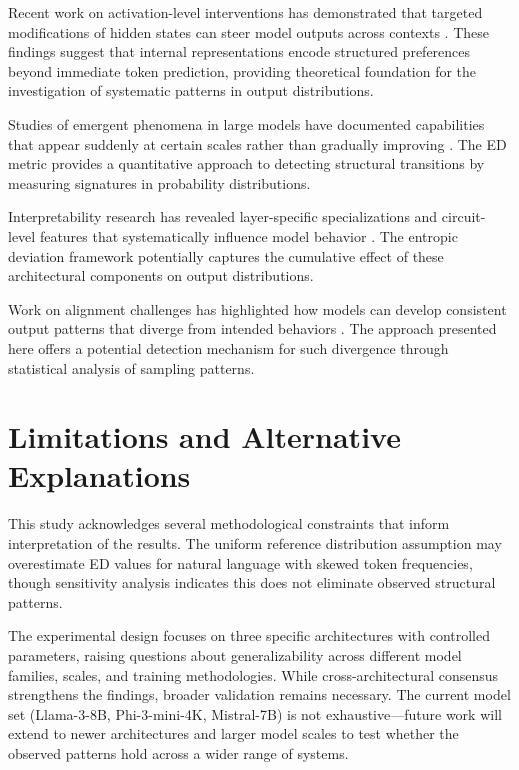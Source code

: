 \documentclass[12pt]{article}
\begin{document}
Recent work on activation-level interventions has demonstrated that targeted modifications of hidden states can steer model outputs across contexts \citep{meng2022locating, zou2023representation}. These findings suggest that internal representations encode structured preferences beyond immediate token prediction, providing theoretical foundation for the investigation of systematic patterns in output distributions.

Studies of emergent phenomena in large models have documented capabilities that appear suddenly at certain scales rather than gradually improving \citep{wei2022emergent}. The ED metric provides a quantitative approach to detecting structural transitions by measuring signatures in probability distributions.

Interpretability research has revealed layer-specific specializations and circuit-level features that systematically influence model behavior \citep{elhage2021mathematical, olsson2022context}. The entropic deviation framework potentially captures the cumulative effect of these architectural components on output distributions.

Work on alignment challenges has highlighted how models can develop consistent output patterns that diverge from intended behaviors \citep{hubinger2021risks, langosco2022goal}. The approach presented here offers a potential detection mechanism for such divergence through statistical analysis of sampling patterns.

\section{Limitations and Alternative Explanations}

This study acknowledges several methodological constraints that inform interpretation of the results. The uniform reference distribution assumption may overestimate ED values for natural language with skewed token frequencies, though sensitivity analysis indicates this does not eliminate observed structural patterns.

The experimental design focuses on three specific architectures with controlled parameters, raising questions about generalizability across different model families, scales, and training methodologies. While cross-architectural consensus strengthens the findings, broader validation remains necessary. The current model set (Llama-3-8B, Phi-3-mini-4K, Mistral-7B) is not exhaustive---future work will extend to newer architectures and larger model scales to test whether the observed patterns hold across a wider range of systems.
\end{document}
